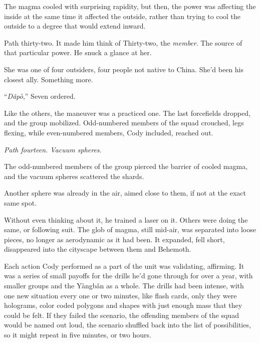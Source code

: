 The magma cooled with surprising rapidity, but then, the power was affecting the inside at the same time it affected the outside, rather than trying to cool the outside to a degree that would extend inward.



Path thirty-two.  It made him think of Thirty-two, the \emph{member}.  The source of that particular power.  He snuck a glance at her.



She was one of four outsiders, four people not native to China.  She'd been his closest ally.  Something more.



``\emph{D\v{a}p\`{o}},'' Seven ordered.



Like the others, the maneuver was a practiced one.  The last forcefields dropped, and the group mobilized.  Odd-numbered members of the squad crouched, legs flexing, while even-numbered members, Cody included, reached out.



\emph{Path fourteen.  Vacuum spheres}.



The odd-numbered members of the group pierced the barrier of cooled magma, and the vacuum spheres scattered the shards.



Another sphere was already in the air, aimed close to them, if not at the exact same spot.



Without even thinking about it, he trained a laser on it.  Others were doing the same, or following suit.  The glob of magma, still mid-air, was separated into loose pieces, no longer as aerodynamic as it had been.  It expanded, fell short, disappeared into the cityscape between them and Behemoth.



Each action Cody performed as a part of the unit was validating, affirming.  It was a series of small payoffs for the drills he'd gone through for over a year, with smaller groups and the Y\`{a}ngb\v{a}n as a whole.  The drills had been intense, with one new situation every one or two minutes, like flash cards, only they were holograms, color coded polygons and shapes with just enough mass that they could be felt.  If they failed the scenario, the offending members of the squad would be named out loud, the scenario shuffled back into the list of possibilities, so it might repeat in five minutes, or two hours.



